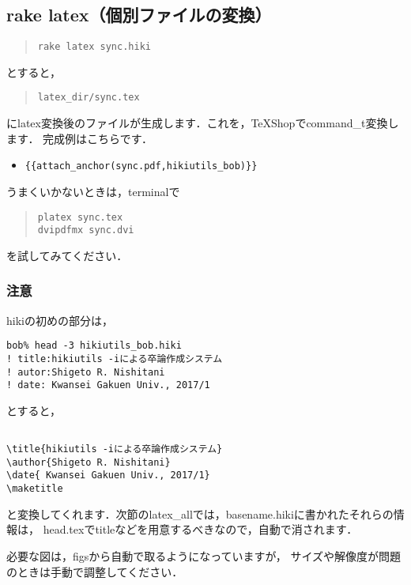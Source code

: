 \subsection{rake latex（個別ファイルの変換）}\begin{quote}\begin{verbatim}
rake latex sync.hiki
\end{verbatim}\end{quote}
とすると，
\begin{quote}\begin{verbatim}
latex_dir/sync.tex
\end{verbatim}\end{quote}
にlatex変換後のファイルが生成します．これを，TeXShopでcommand\_t変換します．
完成例はこちらです．

\begin{itemize}
\item \verb|{{attach_anchor(sync.pdf,hikiutils_bob)}}|
\end{itemize}
うまくいかないときは，terminalで
\begin{quote}\begin{verbatim}
platex sync.tex
dvipdfmx sync.dvi
\end{verbatim}\end{quote}
を試してみてください．

\subsubsection{注意}
hikiの初めの部分は，
\begin{lstlisting}[style=customCsh,basicstyle={\scriptsize\ttfamily}]
bob% head -3 hikiutils_bob.hiki
! title:hikiutils -iによる卒論作成システム
! autor:Shigeto R. Nishitani
! date: Kwansei Gakuen Univ., 2017/1
\end{lstlisting}
とすると，
\begin{lstlisting}[style=customTeX,basicstyle={\scriptsize\ttfamily}]

\title{hikiutils -iによる卒論作成システム}
\author{Shigeto R. Nishitani}
\date{ Kwansei Gakuen Univ., 2017/1}
\maketitle
\end{lstlisting}
と変換してくれます．次節のlatex\_allでは，basename.hikiに書かれたそれらの情報は，
head.texでtitleなどを用意するべきなので，自動で消されます．

必要な図は，figsから自動で取るようになっていますが，
サイズや解像度が問題のときは手動で調整してください．


